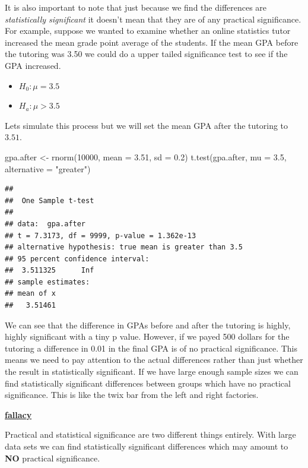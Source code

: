 \documentclass[
]{book}
\newenvironment{Shaded}{\begin{snugshade}}{\end{snugshade}}
\newcommand{\AttributeTok}[1]{\textcolor[rgb]{0.77,0.63,0.00}{#1}}
\newcommand{\DecValTok}[1]{\textcolor[rgb]{0.00,0.00,0.81}{#1}}
\newcommand{\FloatTok}[1]{\textcolor[rgb]{0.00,0.00,0.81}{#1}}
\newcommand{\FunctionTok}[1]{\textcolor[rgb]{0.00,0.00,0.00}{#1}}
\newcommand{\NormalTok}[1]{#1}
\newcommand{\OtherTok}[1]{\textcolor[rgb]{0.56,0.35,0.01}{#1}}
\newcommand{\StringTok}[1]{\textcolor[rgb]{0.31,0.60,0.02}{#1}}
\newenvironment{rmdblock}[1]
  {\begin{shaded*}
  \centerline{\underline{\textbf{#1}}}

  }
  {
  \end{shaded*}
  }
\newenvironment{fallacy}
  {\begin{rmdblock}{fallacy}}
  {\end{rmdblock}}
\theoremstyle{definition}
\theoremstyle{definition}
\theoremstyle{definition}
\theoremstyle{definition}
\theoremstyle{remark}
\begin{document}
It is also important to note that just because we find the differences are \emph{statistically significant} it doesn't mean that they are of any practical significance. For example, suppose we wanted to examine whether an online statistics tutor increased the mean grade point average of the students. If the mean GPA before the tutoring was 3.50 we could do a upper tailed significance test to see if the GPA increased.

\begin{itemize}
\item
  \(H_0: \mu=3.5\)
\item
  \(H_a: \mu > 3.5\)
\end{itemize}

Lets simulate this process but we will set the mean GPA after the tutoring to \(3.51\).

\begin{Shaded}
\begin{Highlighting}[]
\NormalTok{gpa.after }\OtherTok{\textless{}{-}} \FunctionTok{rnorm}\NormalTok{(}\DecValTok{10000}\NormalTok{, }\AttributeTok{mean =} \FloatTok{3.51}\NormalTok{, }\AttributeTok{sd =} \FloatTok{0.2}\NormalTok{)}
\FunctionTok{t.test}\NormalTok{(gpa.after, }\AttributeTok{mu =} \FloatTok{3.5}\NormalTok{, }\AttributeTok{alternative =} \StringTok{"greater"}\NormalTok{)}
\end{Highlighting}
\end{Shaded}

\begin{verbatim}
## 
##  One Sample t-test
## 
## data:  gpa.after
## t = 7.3173, df = 9999, p-value = 1.362e-13
## alternative hypothesis: true mean is greater than 3.5
## 95 percent confidence interval:
##  3.511325      Inf
## sample estimates:
## mean of x 
##   3.51461
\end{verbatim}

We can see that the difference in GPAs before and after the tutoring is highly, highly significant with a tiny p value. However, if we payed 500 dollars for the tutoring a difference in 0.01 in the final GPA is of no practical significance. This means we need to pay attention to the actual differences rather than just whether the result in statistically significant. If we have large enough sample sizes we can find statistically significant differences between groups which have no practical significance. This is like the twix bar from the left and right factories.

\begin{fallacy}
Practical and statistical significance are two different things entirely. With large data sets we can find statistically significant differences which may amount to \textbf{NO} practical significance.
\end{fallacy}
\end{document}
